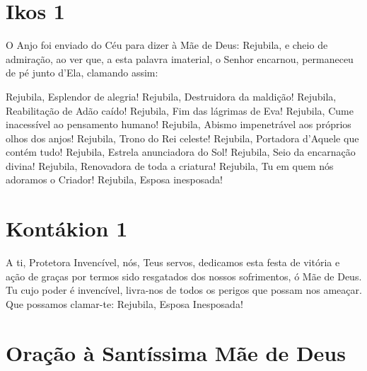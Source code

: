 \documentclass{subfiles}
\begin{document}
\section*{Ikos 1}

O Anjo foi enviado do Céu para dizer à Mãe de Deus: Rejubila, e cheio
de admiração, ao ver que, a esta palavra imaterial, o Senhor encarnou,
permaneceu de pé junto d'Ela, clamando assim:

Rejubila, Esplendor de alegria!
Rejubila, Destruidora da maldição!
Rejubila, Reabilitação de Adão caído!
Rejubila, Fim das lágrimas de Eva!
Rejubila, Cume inacessível ao pensamento humano!
Rejubila, Abismo impenetrável aos próprios olhos dos anjos!
Rejubila, Trono do Rei celeste!
Rejubila, Portadora d'Aquele que contém tudo!
Rejubila, Estrela anunciadora do Sol!
Rejubila, Seio da encarnação divina!
Rejubila, Renovadora de toda a criatura!
Rejubila, Tu em quem nós adoramos o Criador!
Rejubila, Esposa inesposada!

\section*{Kontákion 1}

A ti, Protetora Invencível, nós, Teus servos, dedicamos esta festa de
vitória e ação de graças por termos sido resgatados dos nossos sofrimentos, ó
Mãe de Deus. Tu cujo poder é invencível, livra-nos de todos os perigos que
possam nos ameaçar. Que possamos clamar-te: Rejubila, Esposa Inesposada!

\section*{Oração à Santíssima Mãe de Deus}
\end{document}
